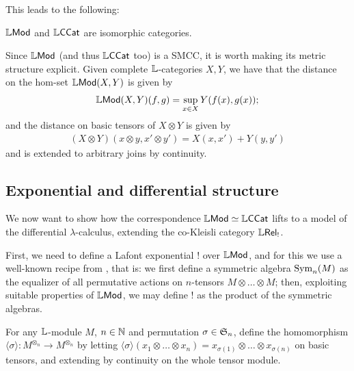 This leads to the following:


\begin{theorem}
$\mathbb{L}\mathsf{Mod}$ and $\mathbb{L}\mathsf{CCat}$ are isomorphic categories.
\end{theorem}


Since $\mathbb{L}\mathsf{Mod}$ (and thus $\mathbb{L}\mathsf{CCat}$ too) is a SMCC, it is worth making its metric structure explicit. Given complete $\mathbb{L}$-categories $X,Y$, we have that the distance on the hom-set $\mathbb{L}\mathsf{Mod}(X,Y)$ is given by 
\begin{align}
\mathbb{L}\mathsf{Mod}(X,Y)(f,g)= \sup_{x\in X}Y(f(x),g(x));
\end{align}
and the distance on basic tensors 
of $X\otimes Y$ is given by
\begin{align}
(X\otimes Y)(x\otimes y, x'\otimes y')=
X(x,x')+Y(y,y')
\end{align}
and is extended to arbitrary joins by continuity.








\subsection{Exponential and differential structure}


We now want to show how the correspondence $\mathbb{L}\mathsf{Mod}\simeq \mathbb{L}\mathsf{CCat}$ lifts to a model of the differential $\lambda$-calculus, extending the co-Kleisli category $\mathbb{L} \mathsf{Rel}_{!}$. 

First, we need to define a Lafont exponential $!$ over $\mathbb{L}\mathsf{Mod}$, and for this we use a well-known recipe from \cite{Mellies2018, Manzo2013}, that is: we first define a symmetric algebra $\mathrm{Sym}_{n}(M)$ as the equalizer of all permutative actions on $n$-tensors $M\otimes \dots \otimes M$; then, exploiting suitable properties of $\mathbb{L}\mathsf{Mod}$, we may define $!$ as the product of the symmetric algebras.  

For any $\mathbb{L}$-module $M$, $n\in \mathbb{N}$ and permutation $\sigma\in \mathfrak{S}_{n}$, define the homomorphism $\langle \sigma\rangle: M^{\otimes_{n}}\to M^{\otimes_{n}}$ by letting 
$\langle\sigma\rangle (x_{1}\otimes \dots \otimes x_{n})=x_{\sigma(1)}\otimes \dots \otimes x_{\sigma(n)}$ on basic tensors, and extending by continuity on the whole tensor module. 


